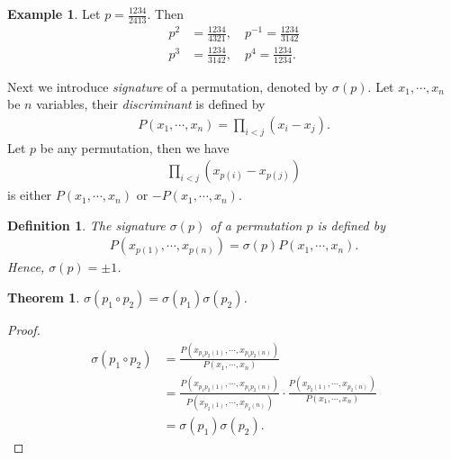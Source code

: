 \documentclass[11pt]{book}
\newtheorem{definition}{Definition}[section]
\newtheorem{theorem}{Theorem}[section]
\theoremstyle{definition}
\newtheorem{example}{Example}[section]
\numberwithin{equation}{subsection}
\begin{document}
\medskip

\begin{example}
Let $p = \frac{1234}{2413}$. Then
\begin{align*}
    p^2 & = \frac{1234}{4321},\quad p^{-1} = \frac{1234}{3142} \\
    p^3 & = \frac{1234}{3142},\quad p^{4} = \frac{1234}{1234}.
\end{align*}
\end{example}

\medskip

Next we introduce \emph{signature} of a permutation, denoted by $\sigma(p)$. Let $x_1,\cdots,x_n$ be $n$ variables, their \emph{discriminant} is defined by 
\begin{align*}
    P(x_1,\cdots,x_n) = \prod_{i < j}(x_i - x_j).
\end{align*}
Let $p$ be any permutation, then we have 
\begin{align*}
    \prod_{i < j}\left(x_{p(i)} - x_{p(j)} \right)
\end{align*}
is either $P(x_1,\cdots,x_n)$ or $- P(x_1,\cdots,x_n)$.

\medskip

\begin{definition}
The signature $\sigma(p)$  of a permutation $p$ is defined by
\begin{align*}
    P\left(x_{p(1)},\cdots,x_{p(n)}\right) = \sigma(p) P(x_1,\cdots,x_n).
\end{align*}
Hence, $\sigma(p) = \pm 1$.
\end{definition}

\medskip

\begin{theorem}
$\sigma(p_1\circ p_2) = \sigma(p_1) \sigma(p_2)$.
\end{theorem}
\begin{proof}
\begin{align*}
    \sigma(p_1\circ p_2) & = \frac{P\left(x_{p_1p_2(1)},\cdots,x_{p_1p_2(n)}\right)}{P(x_1,\cdots,x_n)} \\
    & = \frac{P\left(x_{p_1p_2(1)},\cdots,x_{p_1p_2(n)}\right)}{P(x_{p_2(1)},\cdots,x_{p_2(n)})}\cdot \frac{P\left(x_{p_2(1)},\cdots,x_{p_2(n)}\right)}{P(x_1,\cdots,x_n)}\\
    & = \sigma(p_1) \sigma(p_2).
\end{align*}
\end{proof}

\medskip
\end{document}
